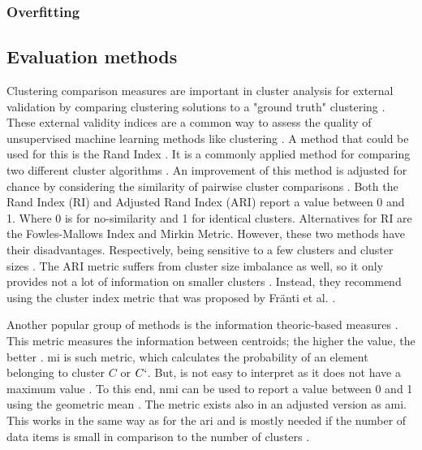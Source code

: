 \citep{bozdemir_privacy-preserving_nodate}
\subsubsection{Overfitting}

\subsection{Evaluation methods} \label{theory:evaluate}
Clustering comparison measures are important in cluster analysis for external validation by comparing clustering solutions to a "ground truth" clustering \citep{vinh_information_nodate-2}.
These external validity indices are a common way to assess the quality of unsupervised machine learning methods like clustering \citep{warrens_understanding_2022}.
A method that could be used for this is the Rand Index \citep{rand_objective_1971}.
It is a commonly applied method for comparing two different cluster algorithms \citep{wagner_comparing_nodate}.
An improvement of this method is adjusted for chance by considering the similarity of pairwise cluster comparisons \citep{vinh_information_nodate-2}.
Both the Rand Index (RI) and Adjusted Rand Index (ARI) \citep{hubert_comparing_1985-1} report a value between 0 and 1.
Where 0 is for no-similarity and 1 for identical clusters.
Alternatives for RI are the Fowles-Mallows Index and Mirkin Metric.
However, these two methods have their disadvantages. Respectively, being sensitive to a few clusters and cluster sizes \citep{wagner_comparing_nodate}.
The ARI metric suffers from cluster size imbalance as well, so it only provides not a lot of information on smaller clusters \citep{warrens_understanding_2022}.
Instead, they recommend using the cluster index metric that was proposed by Fränti et al. \citep{franti_centroid_2014}.

Another popular group of methods is the information theoric-based measures \citep{vinh_information_nodate-2}.
This metric measures the information between centroids; the higher the value, the better \citep{vinh_information_nodate-2}.
\gls{mi} is such metric, which calculates the probability of an element belonging to cluster $C$ or $C`$.
But, is not easy to interpret as it does not have a maximum value \citep{wagner_comparing_nodate}.
To this end, \gls{nmi} can be used to report a value between 0 and 1 using the geometric mean \citep{strehl_cluster_2002}.
The metric exists also in an adjusted version as \gls{ami}.
This works in the same way as for the \gls{ari} and is mostly needed if the number of data items is small in comparison to the number of clusters \citep{vinh_information_nodate-2}. \newline

